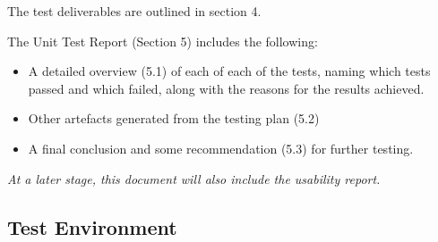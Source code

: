 \documentclass{article}
\begin{document}
		The test deliverables are outlined in section 4.
		
		The Unit Test Report (Section 5) includes the following:
		\begin{itemize}
			\item A detailed overview (5.1) of each of each of the tests, naming which tests passed and which failed, along with the reasons for the results achieved.
			\item Other artefacts generated from the testing plan (5.2)
			\item A final conclusion and some recommendation (5.3) for further testing.
		\end{itemize}
		
		\textit{At a later stage, this document will also include the usability report.}
		
	\subsection{Test Environment}
	
\end{document}

